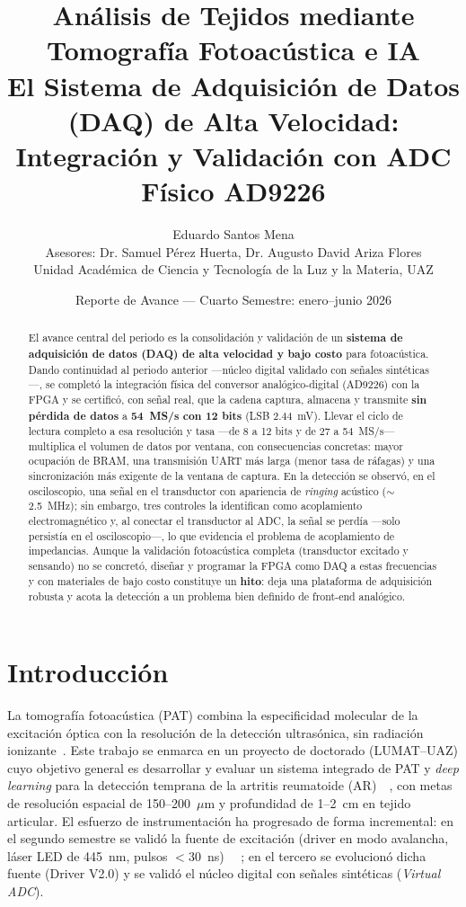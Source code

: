 \documentclass[12pt,letterpaper]{article}
\title{Análisis de Tejidos mediante Tomografía Fotoacústica e IA\\
El Sistema de Adquisición de Datos (DAQ) de Alta Velocidad:\\
Integración y Validación con ADC Físico AD9226}
\author{Eduardo Santos Mena \\ Asesores: Dr. Samuel Pérez Huerta, Dr. Augusto David Ariza Flores \\
\small Unidad Académica de Ciencia y Tecnología de la Luz y la Materia, UAZ}
\date{Reporte de Avance — Cuarto Semestre: enero–junio 2026}
\begin{document}
\maketitle

\begin{abstract}
\noindent
El avance central del periodo es la consolidación y validación de un \textbf{sistema
de adquisición de datos (DAQ) de alta velocidad y bajo costo} para fotoacústica.
Dando continuidad al periodo anterior —núcleo digital validado con señales sintéticas—,
se completó la integración física del conversor analógico-digital (AD9226) con la FPGA
y se certificó, con señal real, que la cadena captura, almacena y transmite
\textbf{sin pérdida de datos} a \textbf{54~MS/s con 12 bits} (LSB 2.44~mV). Llevar el
ciclo de lectura completo a esa resolución y tasa —de 8 a 12 bits y de 27 a 54~MS/s—
multiplica el volumen de datos por ventana, con consecuencias concretas: mayor
ocupación de BRAM, una transmisión UART más larga (menor tasa de ráfagas) y una
sincronización más exigente de la ventana de captura. En la detección se observó, en
el osciloscopio, una señal en el transductor con apariencia de \textit{ringing}
acústico ($\sim$2.5~MHz); sin embargo, tres controles la identifican como acoplamiento
electromagnético y, al conectar el transductor al ADC, la señal se perdía —solo
persistía en el osciloscopio—, lo que evidencia el problema de acoplamiento de
impedancias. Aunque la validación fotoacústica completa (transductor excitado y
sensando) no se concretó, diseñar y programar la FPGA como DAQ a estas frecuencias y
con materiales de bajo costo constituye un \textbf{hito}: deja una plataforma de
adquisición robusta y acota la detección a un problema bien definido de front-end
analógico.
\end{abstract}

\section{Introducción}

La tomografía fotoacústica (PAT) combina la especificidad molecular de la excitación
óptica con la resolución de la detección ultrasónica, sin radiación
ionizante~\cite{lin_emerging_2022}. Este trabajo se enmarca en un proyecto de
doctorado (LUMAT--UAZ) cuyo objetivo general es desarrollar y evaluar un sistema
integrado de PAT y \textit{deep learning} para la detección temprana de la artritis
reumatoide (AR)~\cite{hauptmann_deep_2020}~\cite{grohl_deep_2021}, con metas de
resolución espacial de 150--200~$\mu$m y profundidad de 1--2~cm en tejido articular.
El esfuerzo de instrumentación ha progresado de forma incremental: en el segundo
semestre se validó la fuente de excitación (driver en modo avalancha, láser LED de
\SI{445}{\nano\meter}, pulsos $<$\SI{30}{\nano\second})~\cite{wu_advanced_2021}
~\cite{li_photoacoustic_2020}; en el tercero se evolucionó dicha fuente (Driver V2.0)
y se validó el núcleo digital con señales sintéticas (\textit{Virtual ADC}).
\end{document}
